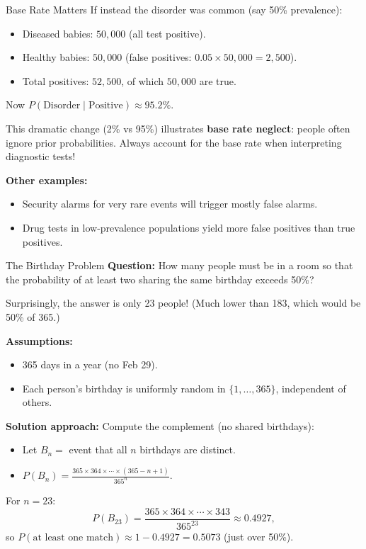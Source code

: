 \documentclass[aspectratio=169,11pt]{beamer} %
\begin{document}
\begin{frame}[fragile]{Base Rate Matters}
If instead the disorder was common (say 50\% prevalence):
\begin{itemize}
    \item Diseased babies: $50{,}000$ (all test positive).
    \item Healthy babies: $50{,}000$ (false positives: $0.05 \times 50{,}000 = 2{,}500$).
    \item Total positives: $52{,}500$, of which $50{,}000$ are true.
\end{itemize}
Now $P(\text{Disorder} \mid \text{Positive}) \approx 95.2\%$. \newline

This dramatic change (2\% vs 95\%) illustrates \textbf{base rate neglect}: people often ignore prior probabilities. Always account for the base rate when interpreting diagnostic tests! \newline

\textbf{Other examples:} 
\begin{itemize}
    \item Security alarms for very rare events will trigger mostly false alarms.
    \item Drug tests in low-prevalence populations yield more false positives than true positives.
\end{itemize}
\end{frame}

\begin{frame}{The Birthday Problem}
\textbf{Question:} How many people must be in a room so that the probability of at least two sharing the same birthday exceeds 50\%?

Surprisingly, the answer is only 23 people! (Much lower than 183, which would be 50\% of 365.) \newline

\textbf{Assumptions:} 
\begin{itemize}
    \item 365 days in a year (no Feb 29).
    \item Each person's birthday is uniformly random in $\{1,\dots,365\}$, independent of others.
\end{itemize}

\textbf{Solution approach:} Compute the complement (no shared birthdays):
\begin{itemize}
    \item Let $B_n =$ event that all $n$ birthdays are distinct.
    \item $P(B_n) = \frac{365 \times 364 \times \cdots \times (365-n+1)}{365^n}.$ 
\end{itemize}
For $n=23$:
\[P(B_{23}) = \frac{365 \times 364 \times \cdots \times 343}{365^{23}} \approx 0.4927,\] 
so $P(\text{at least one match}) \approx 1 - 0.4927 = 0.5073$ (just over 50\%).
\end{frame}
\end{document}
